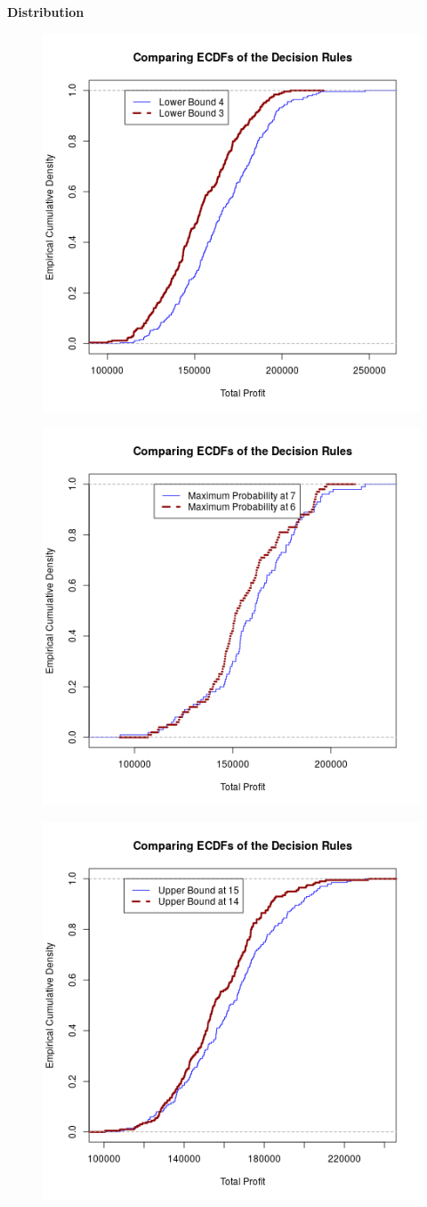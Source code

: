 \documentclass[grey,handout]{beamer}
\renewcommand{\frametitle}[1]{\begin{center}\textbf{#1}\end{center}}
\begin{document}
\begin{frame}
  \frametitle{Distribution}
  \begin{multicols}{3}
  \begin{figure}[H]
  \centering
  \includegraphics[width=.3\textwidth]{lbECDF.png}
  \end{figure}
  \begin{figure}[H]
  \centering
  \includegraphics[width=.3\textwidth]{maxECDF.png}
  \end{figure}
  \begin{figure}[H]
  \centering
  \includegraphics[width=.3\textwidth]{ubECDF.png}
  \end{figure}
  
  \end{multicols}
\end{frame}
\end{document}
